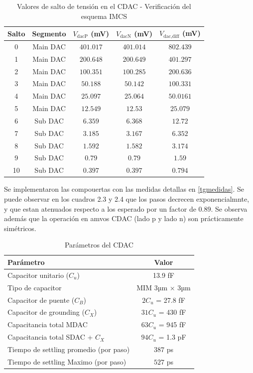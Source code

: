 \documentclass[12pt,a4paper]{report}
\begin{document}
\begin{table}[H]
\centering
\caption{Valores de salto de tensión en el CDAC - Verificación del esquema IMCS}
\label{tab:cdac_voltage_steps}
\begin{tabular}{ccccc}
\toprule
\textbf{Salto} & \textbf{Segmento} & \textbf{$V_{\text{dacP}}$ (mV)} & \textbf{$V_{\text{dacN}}$ (mV)} & \textbf{$V_{\text{dac,diff}}$ (mV)} \\
\midrule
0 & Main DAC & $401.017$ & $401.014$ & $802.439$ \\
1 & Main DAC & $200.648$ & $200.649$ & $401.297$ \\
2 & Main DAC & $100.351$ & $100.285$ & $200.636$ \\
3 & Main DAC & $50.188$ & $50.142$ & $100.331$ \\
4 & Main DAC & $25.097$ & $25.064$ & $50.0161$ \\
5 & Main DAC & $12.549$ & $12.53$ & $25.079$ \\
\midrule
6  & Sub DAC & $6.359$ & $6.368$ & $12.72$ \\
7 & Sub DAC & $3.185$ & $3.167$ & $6.352$ \\
8 & Sub DAC & $1.592$ & $1.582$ & $3.174$ \\
9 & Sub DAC & $0.79$ & $0.79$ & $1.59$ \\
10 & Sub DAC & $0.397$ & $0.397$ & $0.794$ \\

\end{tabular}
\end{table}

Se implementaron las compouertas con las medidas detallas en \cref{tgmedidas}. Se puede observar en los cuadros 2.3 y 2.4 que los pasos decrecen exponencialmnte, y que estan atenuados respecto a los esperado por un factor de $0.89$. Se observa además que la operación en amvos CDAC (lado p y lado n) son prácticamente simétricos.


\begin{table}[H]
\centering
\caption{Parámetros del CDAC}
\begin{tabular}{|l|c|}
\hline
\textbf{Parámetro} & \textbf{Valor} \\
\hline
Capacitor unitario ($C_u$) & 13.9 fF \\
Tipo de capacitor & MIM 3µm × 3µm \\
Capacitor de puente ($C_B$) & $2 C_u$ = 27.8 fF \\
Capacitor de grounding ($C_X$) & $31 C_u$ = 430 fF \\
Capacitancia total MDAC & $63 C_u$ = 945 fF \\
Capacitancia total SDAC + $C_X$ & $94 C_u$ = 1.3 pF \\
Tiempo de settling promedio (por paso) & $387$ ps \\
Tiempo de settling Maximo (por paso) & $527$ ps \\
\hline
\end{tabular}
\end{table}
\end{document}
